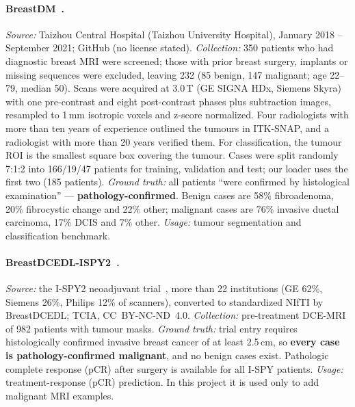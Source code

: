 \documentclass[11pt]{article}
\begin{document}
\paragraph{BreastDM~\citep{zhao2023breastdm}.}
\emph{Source:} Taizhou Central Hospital (Taizhou University Hospital),
January 2018 -- September 2021; GitHub (no license stated).
\emph{Collection:} 350 patients who had diagnostic breast MRI were screened;
those with prior breast surgery, implants or missing sequences were excluded,
leaving 232 (85 benign, 147 malignant; age 22--79, median 50). Scans were
acquired at 3.0\,T (GE SIGNA HDx, Siemens Skyra) with one pre-contrast and
eight post-contrast phases plus subtraction images, resampled to 1\,mm
isotropic voxels and z-score normalized. Four radiologists with more than ten
years of experience outlined the tumours in ITK-SNAP, and a radiologist with
more than 20 years verified them. For classification, the tumour ROI is the
smallest square box covering the tumour. Cases were split randomly 7:1:2 into
166/19/47 patients for training, validation and test; our loader uses the
first two (185 patients). \emph{Ground truth:} all patients ``were confirmed
by histological examination'' --- \textbf{pathology-confirmed}. Benign cases
are 58\% fibroadenoma, 20\% fibrocystic change and 22\% other; malignant
cases are 76\% invasive ductal carcinoma, 17\% DCIS and 7\% other.
\emph{Usage:} tumour segmentation and classification benchmark.

\paragraph{BreastDCEDL-ISPY2~\citep{fridman2026breastdcedl,fridman2025breastdcedl}.}
\emph{Source:} the I-SPY2 neoadjuvant trial~\citep{barker2009ispy2}, more than
22 institutions (GE 62\%, Siemens 26\%, Philips 12\% of scanners), converted
to standardized NIfTI by BreastDCEDL; TCIA, CC~BY-NC-ND~4.0.
\emph{Collection:} pre-treatment DCE-MRI of 982 patients with tumour masks.
\emph{Ground truth:} trial entry requires histologically confirmed invasive
breast cancer of at least 2.5\,cm, so \textbf{every case is
pathology-confirmed malignant}, and no benign cases exist. Pathologic complete
response (pCR) after surgery is available for all I-SPY patients.
\emph{Usage:} treatment-response (pCR) prediction. In this project it is
used only to add malignant MRI examples.
\end{document}
